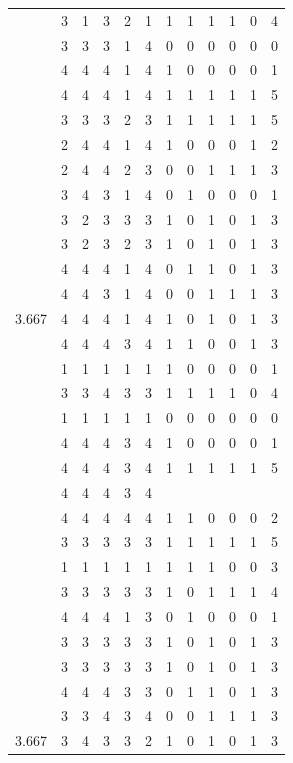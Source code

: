 \documentclass[]{book}
\theoremstyle{definition}
\theoremstyle{definition}
\theoremstyle{definition}
\theoremstyle{remark}
\begin{document}
\begin{table}
{\begin{tabular}[t]{rrrrrrrrrrrr}
 & 3 & 1 & 3 & 2 & 1 & 1 & 1 & 1 & 1 & 0 & 4\\
 & 3 & 3 & 3 & 1 & 4 & 0 & 0 & 0 & 0 & 0 & 0\\
 & 4 & 4 & 4 & 1 & 4 & 1 & 0 & 0 & 0 & 0 & 1\\
 & 4 & 4 & 4 & 1 & 4 & 1 & 1 & 1 & 1 & 1 & 5\\
 & 3 & 3 & 3 & 2 & 3 & 1 & 1 & 1 & 1 & 1 & 5\\
 & 2 & 4 & 4 & 1 & 4 & 1 & 0 & 0 & 0 & 1 & 2\\
 & 2 & 4 & 4 & 2 & 3 & 0 & 0 & 1 & 1 & 1 & 3\\
 & 3 & 4 & 3 & 1 & 4 & 0 & 1 & 0 & 0 & 0 & 1\\
 & 3 & 2 & 3 & 3 & 3 & 1 & 0 & 1 & 0 & 1 & 3\\
 & 3 & 2 & 3 & 2 & 3 & 1 & 0 & 1 & 0 & 1 & 3\\
 & 4 & 4 & 4 & 1 & 4 & 0 & 1 & 1 & 0 & 1 & 3\\
 & 4 & 4 & 3 & 1 & 4 & 0 & 0 & 1 & 1 & 1 & 3\\
3.667 & 4 & 4 & 4 & 1 & 4 & 1 & 0 & 1 & 0 & 1 & 3\\
 & 4 & 4 & 4 & 3 & 4 & 1 & 1 & 0 & 0 & 1 & 3\\
 & 1 & 1 & 1 & 1 & 1 & 1 & 0 & 0 & 0 & 0 & 1\\
 & 3 & 3 & 4 & 3 & 3 & 1 & 1 & 1 & 1 & 0 & 4\\
 & 1 & 1 & 1 & 1 & 1 & 0 & 0 & 0 & 0 & 0 & 0\\
 & 4 & 4 & 4 & 3 & 4 & 1 & 0 & 0 & 0 & 0 & 1\\
 & 4 & 4 & 4 & 3 & 4 & 1 & 1 & 1 & 1 & 1 & 5\\
 & 4 & 4 & 4 & 3 & 4 &  &  &  &  &  & \\
 & 4 & 4 & 4 & 4 & 4 & 1 & 1 & 0 & 0 & 0 & 2\\
 & 3 & 3 & 3 & 3 & 3 & 1 & 1 & 1 & 1 & 1 & 5\\
 & 1 & 1 & 1 & 1 & 1 & 1 & 1 & 1 & 0 & 0 & 3\\
 & 3 & 3 & 3 & 3 & 3 & 1 & 0 & 1 & 1 & 1 & 4\\
 & 4 & 4 & 4 & 1 & 3 & 0 & 1 & 0 & 0 & 0 & 1\\
 & 3 & 3 & 3 & 3 & 3 & 1 & 0 & 1 & 0 & 1 & 3\\
 & 3 & 3 & 3 & 3 & 3 & 1 & 0 & 1 & 0 & 1 & 3\\
 & 4 & 4 & 4 & 3 & 3 & 0 & 1 & 1 & 0 & 1 & 3\\
 & 3 & 3 & 4 & 3 & 4 & 0 & 0 & 1 & 1 & 1 & 3\\
3.667 & 3 & 4 & 3 & 3 & 2 & 1 & 0 & 1 & 0 & 1 & 3\\

\end{tabular}}
\end{table}
\end{document}
